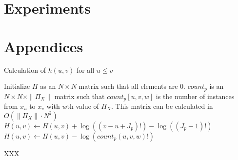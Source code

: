 
\section{Experiments}
\label{sec:experiments}









\section*{Appendices}

\begin{algorithm}
  \caption{ Calculation of $h(u,v)$ for all $u \leq v$}
  \label{alg:h}
  \begin{algorithmic}[1]
    \State Initialize $H$ as an $N \times N$ matrix such that all elements are 0.
    \State $count_p$ is an $N \times N \times \|\Pi_X\|$ matrix such that $count_p [u,v,w]$ is the number of instances from $x_u$ to $x_v$ with $w$th value of $\Pi_X$. This matrix can be calculated in $O(\|\Pi_X\| \cdot N^2)$
        \State $H(u,v) \leftarrow H(u,v) + \log((v-u + J_p)!) - \log((J_p -1)!)$
          \State $H(u,v) \leftarrow H(u,v) - \log( count_p(u,v,w)!)$
        \EndFor
      \EndFor
    \EndFor

      \State XXX
    \EndFor
  \end{algorithmic}
\end{algorithm}



